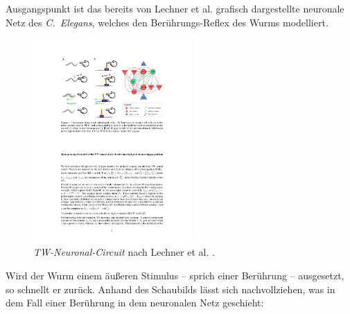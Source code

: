 	Ausgangspunkt ist das bereits von Lechner et al. \cite{WormLevelRL} grafisch dargestellte neuronale Netz des \textit{C.~Elegans}, welches den Berührungs-Reflex des Wurms modelliert.
	\begin{figure}[H] %
		\centering
		\includegraphics[width=6cm]{figures/chap_neuron/Orig_TW_Circuit.pdf}
		\caption{\textit{TW-Neuronal-Circuit} nach Lechner et al. \cite{WormLevelRL}.}
		\label{fig:01_TW-Circuit}
	\end{figure}
	Wird der Wurm einem äußeren Stimulus -- sprich einer Berührung -- ausgesetzt, so schnellt er zurück. Anhand des Schaubilds lässt sich nachvollziehen, was in dem Fall einer Berührung in dem neuronalen Netz geschieht:
	
